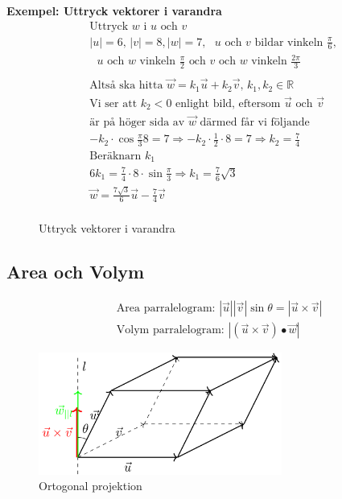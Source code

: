 \begin{multicols}{2}
\textbf{Exempel: Uttryck vektorer i varandra}
\begin{align*}
  &\text{Uttryck $w$ i $u$ och $v$} \\
  &|u|=6, \, |v|=8, |w|=7, \text{ $u$ och $v$ bildar vinkeln } \frac{\pi}{6}, \\
  &\text{ $u$ och $w$ vinkeln } \frac{\pi}{2} \text{ och $v$ och $w$ vinkeln } 
  \frac{2\pi}{3}  \\
  &\\
  &\text{Altså ska hitta } \vec{w}=k_1\vec{u}+k_2\vec{v}, \, k_1,k_2\in\mathbb{R} \\
  &\text{Vi ser att $k_2<0$ enlight bild, eftersom $\vec{u}$ och $\vec{v}$} \\
  &\text{är på höger sida av $\vec{w}$ därmed får vi följande } \\
  &-k_2\cdot\cos{\frac{\pi}{3}}8=7 \Rightarrow -k_2\cdot{\frac{1}{2}}\cdot{8}=7
  \Rightarrow k_2=\frac{7}{4} \\
  &\text{Beräknarn $k_1$ } \\
  &6k_1=\frac{7}{4}\cdot{8}\cdot{\sin{\frac{\pi}{3}}} \Rightarrow k_1=\frac{7}{6}\sqrt{3} \\
  &\vec{w}=\frac{7\sqrt{3}}{6}\vec{u}-\frac{7}{4}\vec{v} \\
\end{align*}
\begin{figure}[H]
    \centering
    
    \caption{Uttryck vektorer i varandra}
\end{figure}


\subsection{Area och Volym}
\begin{align*} 
  &\quad  \text{Area parralelogram: } |\vec{u}||\vec{v}|\sin{\theta} = |\vec{u}\times\vec{v}| \\
  &\quad  \text{Volym parralelogram: } |(\vec{u}\times\vec{v})\bullet\vec{w}|
\end{align*}

\begin{figure}[H]
    \centering
    \includegraphics[width=8cm]{image/parallelogram.png} 
    \caption{Ortogonal projektion}
\end{figure}


\end{multicols}
